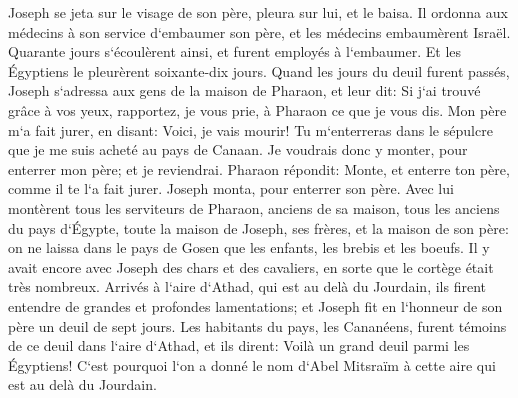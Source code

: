 \verse Joseph se jeta sur le visage de son père, pleura sur lui, et le baisa. 
\verse Il ordonna aux médecins à son service d`embaumer son père, et les médecins embaumèrent Israël. 
\verse Quarante jours s`écoulèrent ainsi, et furent employés à l`embaumer. Et les Égyptiens le pleurèrent soixante-dix jours. 
\verse Quand les jours du deuil furent passés, Joseph s`adressa aux gens de la maison de Pharaon, et leur dit: Si j`ai trouvé grâce à vos yeux, rapportez, je vous prie, à Pharaon ce que je vous dis. 
\verse Mon père m`a fait jurer, en disant: Voici, je vais mourir! Tu m`enterreras dans le sépulcre que je me suis acheté au pays de Canaan. Je voudrais donc y monter, pour enterrer mon père; et je reviendrai. 
\verse Pharaon répondit: Monte, et enterre ton père, comme il te l`a fait jurer. 
\verse Joseph monta, pour enterrer son père. Avec lui montèrent tous les serviteurs de Pharaon, anciens de sa maison, tous les anciens du pays d`Égypte, 
\verse toute la maison de Joseph, ses frères, et la maison de son père: on ne laissa dans le pays de Gosen que les enfants, les brebis et les boeufs. 
\verse Il y avait encore avec Joseph des chars et des cavaliers, en sorte que le cortège était très nombreux. 
\verse Arrivés à l`aire d`Athad, qui est au delà du Jourdain, ils firent entendre de grandes et profondes lamentations; et Joseph fit en l`honneur de son père un deuil de sept jours. 
\verse Les habitants du pays, les Cananéens, furent témoins de ce deuil dans l`aire d`Athad, et ils dirent: Voilà un grand deuil parmi les Égyptiens! C`est pourquoi l`on a donné le nom d`Abel Mitsraïm à cette aire qui est au delà du Jourdain. 
